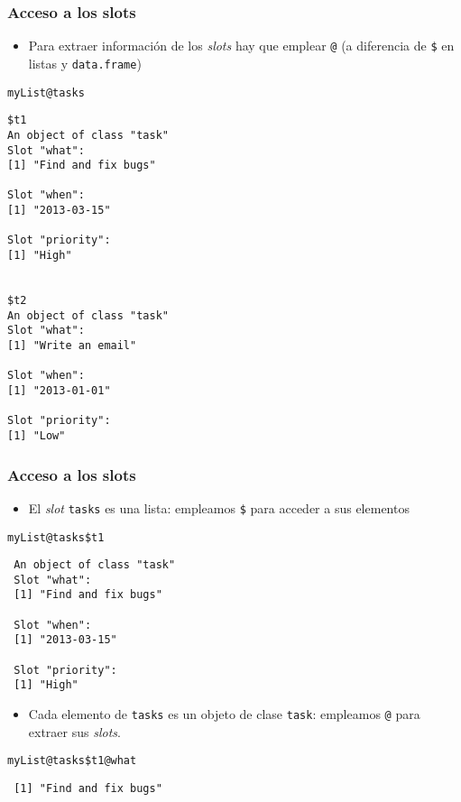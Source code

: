 \documentclass[xcolor={usenames,svgnames,dvipsnames}]{beamer}
\begin{document}
\begin{frame}[fragile]
\frametitle{Acceso a los slots}
\label{sec-3-1-6}

\begin{itemize}
\item Para extraer información de los \emph{slots} hay que emplear \texttt{@} (a
  diferencia de \texttt{\$} en listas y \texttt{data.frame})
\end{itemize}

\lstset{language=R}
\begin{lstlisting}
myList@tasks
\end{lstlisting}


\begin{verbatim}
$t1
An object of class "task"
Slot "what":
[1] "Find and fix bugs"

Slot "when":
[1] "2013-03-15"

Slot "priority":
[1] "High"


$t2
An object of class "task"
Slot "what":
[1] "Write an email"

Slot "when":
[1] "2013-01-01"

Slot "priority":
[1] "Low"
\end{verbatim}
\end{frame}
\begin{frame}[fragile]
\frametitle{Acceso a los slots}
\label{sec-3-1-7}

\begin{itemize}
\item El \emph{slot} \texttt{tasks} es una lista: empleamos \texttt{\$} para acceder a sus elementos
\end{itemize}

\lstset{language=R}
\begin{lstlisting}
myList@tasks$t1
\end{lstlisting}

\begin{verbatim}
 An object of class "task"
 Slot "what":
 [1] "Find and fix bugs"
 
 Slot "when":
 [1] "2013-03-15"
 
 Slot "priority":
 [1] "High"
\end{verbatim}

\begin{itemize}
\item Cada elemento de \texttt{tasks} es un objeto de clase \texttt{task}: empleamos
  \texttt{@} para extraer sus \emph{slots}.
\end{itemize}

\lstset{language=R}
\begin{lstlisting}
myList@tasks$t1@what
\end{lstlisting}

\begin{verbatim}
 [1] "Find and fix bugs"
\end{verbatim}
\end{frame}
\end{document}
